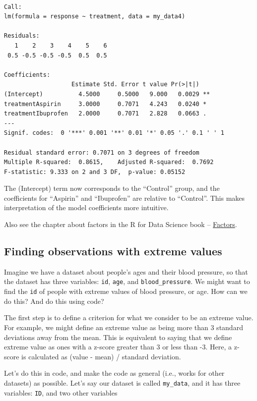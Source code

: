 \documentclass[
  letterpaper,
  8pt,
  a4paper]{book}
\begin{document}
\begin{verbatim}

Call:
lm(formula = response ~ treatment, data = my_data4)

Residuals:
   1    2    3    4    5    6 
 0.5 -0.5 -0.5 -0.5  0.5  0.5 

Coefficients:
                   Estimate Std. Error t value Pr(>|t|)   
(Intercept)          4.5000     0.5000   9.000   0.0029 **
treatmentAspirin     3.0000     0.7071   4.243   0.0240 * 
treatmentIbuprofen   2.0000     0.7071   2.828   0.0663 . 
---
Signif. codes:  0 '***' 0.001 '**' 0.01 '*' 0.05 '.' 0.1 ' ' 1

Residual standard error: 0.7071 on 3 degrees of freedom
Multiple R-squared:  0.8615,    Adjusted R-squared:  0.7692 
F-statistic: 9.333 on 2 and 3 DF,  p-value: 0.05152
\end{verbatim}

The (Intercept) term now corresponds to the ``Control'' group, and the
coefficients for ``Aspirin'' and ``Ibuprofen'' are relative to
``Control''. This makes interpretation of the model coefficients more
intuitive.

Also see the chapter about factors in the R for Data Science book --
\href{https://r4ds.hadley.nz/factors.html}{Factors}.

\subsection*{Finding observations with extreme
values}\label{finding-observations-with-extreme-values}

Imagine we have a dataset about people's ages and their blood pressure,
so that the dataset has three variables: \texttt{id}, \texttt{age}, and
\texttt{blood\_pressure}. We might want to find the \texttt{id} of
people with extreme values of blood pressure, or age. How can we do
this? And do this using code?

The first step is to define a criterion for what we consider to be an
extreme value. For example, we might define an extreme value as being
more than 3 standard deviations away from the mean. This is equivalent
to saying that we define extreme value as ones with a z-score greater
than 3 or less than -3. Here, a z-score is calculated as (value - mean)
/ standard deviation.

Let's do this in code, and make the code as general (i.e., works for
other datasets) as possible. Let's say our dataset is called
\texttt{my\_data}, and it has three variables: \texttt{ID}, and two
other variables
\end{document}
